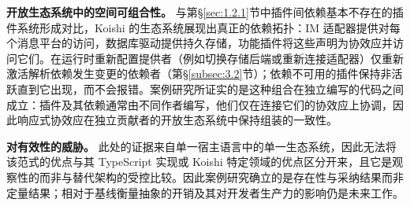 \textbf{开放生态系统中的空间可组合性。} 与第\S\ref{sec:1.2.1}节中插件间依赖基本不存在的插件系统形成对比，Koishi 的生态系统展现出真正的依赖拓扑：IM 适配器提供对每个消息平台的访问，数据库驱动提供持久存储，功能插件将这些声明为协效应并访问它们。在运行时重新配置提供者（例如切换存储后端或重新连接适配器）仅重新激活解析依赖发生变更的依赖者（第\S\ref{subsec:3.2}节）；依赖不可用的插件保持非活跃直到它出现，而不会报错。案例研究所证实的是这种组合在独立编写的代码之间成立：插件及其依赖通常由不同作者编写，他们仅在连接它们的协效应上协调，因此响应式协效应在独立贡献者的开放生态系统中保持组装的一致性。

\textbf{对有效性的威胁。} 此处的证据来自单一宿主语言中的单一生态系统，因此无法将该范式的优点与其 TypeScript 实现或 Koishi 特定领域的优点区分开来，且它是观察性的而非与替代架构的受控比较。因此案例研究确立的是存在性与采纳结果而非定量结果；相对于基线衡量抽象的开销及其对开发者生产力的影响仍是未来工作。